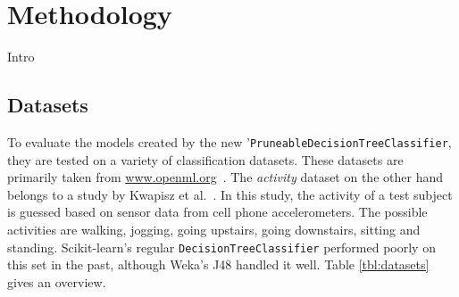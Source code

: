 \chapter{Methodology}\label{cha:method}
Intro


\section{Datasets}
To evaluate the models created by the new '\texttt{PruneableDecisionTreeClassifier}, they are tested on a variety of classification datasets. These datasets are primarily taken from \url{www.openml.org}~\cite{openml}. The \emph{activity} dataset on the other hand belongs to a study by Kwapisz et al.~\cite{problematic_dataset}. In this study, the activity of a test subject is guessed based on sensor data from cell phone accelerometers. The possible activities are walking, jogging, going upstairs, going downstairs, sitting and standing. Scikit-learn's regular \texttt{DecisionTreeClassifier} performed poorly on this set in the past, although Weka's J48 handled it well. Table \ref{tbl:datasets} gives an overview.


